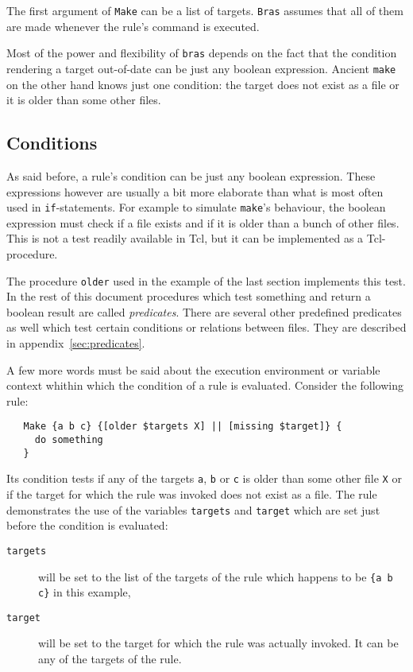 \documentclass[11pt]{scrartcl}
\newcommand{\bras}{\texttt{bras}}
\newcommand{\Bras}{\texttt{Bras}}
\newcommand{\make}{\texttt{make}}
\begin{document}
The first argument of \texttt{Make} can be a list of targets.
\Bras{} assumes that all of them are made whenever the rule's command
is executed.

Most of the power and flexibility of \bras{} depends on the fact that
the condition rendering a target out-of-date can be just any
boolean expression. Ancient \make{} on the other hand knows just one
condition: the target does not exist as a file or it is older than
some other files.


\subsection{Conditions}

As said before, a rule's condition can be just any boolean expression.
These expressions however are usually a bit more elaborate than what
is most often used in \texttt{if}-statements. For example to simulate
\make's behaviour, the boolean expression must check if a file exists
and if it is older than a bunch of other files. This is not a test
readily available in Tcl, but it can be implemented as a
Tcl-procedure.

The procedure \texttt{older} used in the example of the last section
implements this test. In the rest of this document procedures which
test something and return a boolean result are called
\textit{predicates}. There are several other
predefined predicates as well which test certain conditions or
relations between files. They are described in
appendix~\ref{sec:predicates}.

A few more words must be said about the execution environment or
variable context whithin which the condition of a rule is evaluated.
Consider the following rule:
\begin{verbatim}
   Make {a b c} {[older $targets X] || [missing $target]} {
     do something
   }
\end{verbatim}
Its condition tests if any of the targets \texttt{a}, \texttt{b} or
\texttt{c} is older than some other file \texttt{X} or if the target
for which the rule was invoked does not exist as a file. The rule
demonstrates the use of the variables \texttt{targets} and
\texttt{target} which are set just before the condition is evaluated:
\begin{description}
\item[\texttt{targets}] will be set
to the list of the targets of the rule which happens to be \texttt{\{a
  b c\}} in this example,
\item[\texttt{target}] will be set to the target for which the rule
  was actually invoked. It can be any of the targets of the rule.
\end{description}
\end{document}
